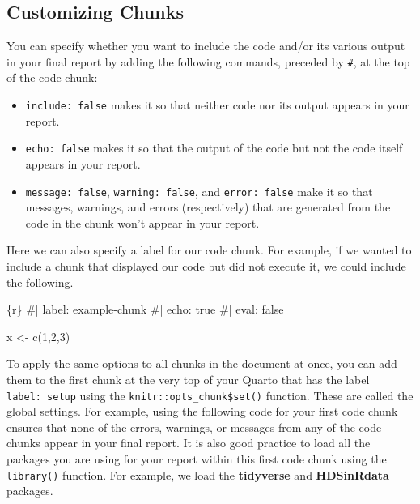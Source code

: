 \documentclass[
  letterpaper,
]{latex/krantz}
\makeatletter
\newenvironment{Shaded}{\begin{snugshade}}{\end{snugshade}}
\newcommand{\InformationTok}[1]{\textcolor[rgb]{0.37,0.37,0.37}{#1}}
\newenvironment{kframe}{%
\medskip{}
\setlength{\fboxsep}{.8em}
 \def\at@end@of@kframe{}%
 \ifinner\ifhmode%
  \def\at@end@of@kframe{\end{minipage}}%
  \begin{minipage}{\columnwidth}%
 \fi\fi%
 \def\FrameCommand##1{\hskip\@totalleftmargin \hskip-\fboxsep
 \colorbox{shadecolor}{##1}\hskip-\fboxsep
     \hskip-\linewidth \hskip-\@totalleftmargin \hskip\columnwidth}%
 \MakeFramed {\advance\hsize-\width
   \@totalleftmargin\z@ \linewidth\hsize
   \@setminipage}}%
 {\par\unskip\endMakeFramed%
 \at@end@of@kframe}
\renewenvironment{Shaded}{\begin{kframe}}{\end{kframe}}
\makeatother
\begin{document}
\subsection{Customizing Chunks}\label{customizing-chunks}

You can specify whether you want to include the code and/or its various
output in your final report by adding the following commands, preceded
by \texttt{\#\textbar{}}, at the top of the code chunk:

\begin{itemize}
\item
  \texttt{include:\ false} makes it so that neither code nor its output
  appears in your report.
\item
  \texttt{echo:\ false} makes it so that the output of the code but not
  the code itself appears in your report.
\item
  \texttt{message:\ false}, \texttt{warning:\ false}, and
  \texttt{error:\ false} make it so that messages, warnings, and errors
  (respectively) that are generated from the code in the chunk won't
  appear in your report.
\end{itemize}

Here we can also specify a label for our code chunk. For example, if we
wanted to include a chunk that displayed our code but did not execute
it, we could include the following.

\begin{Shaded}
\begin{Highlighting}[]
  \InformationTok{\textasciigrave{}\textasciigrave{}\textasciigrave{}\{r\}}
\InformationTok{\#| label: example{-}chunk}
\InformationTok{\#| echo: true}
\InformationTok{\#| eval: false}

\InformationTok{x \textless{}{-} c(1,2,3)}
\InformationTok{\textasciigrave{}\textasciigrave{}\textasciigrave{}}
\end{Highlighting}
\end{Shaded}

To apply the same options to all chunks in the document at once, you can
add them to the first chunk at the very top of your Quarto that has the
label \texttt{label:\ setup} using the
\texttt{knitr::opts\_chunk\$set()}
function.
These are called the global settings. For example, using the following
code for your first code chunk ensures that none of the errors,
warnings, or messages from any of the code chunks appear in your final
report. It is also good practice to load all the packages you are using
for your report within this first code chunk using the
\texttt{library()} function. For example, we load the
\textbf{tidyverse} and
\textbf{HDSinRdata} packages.
\end{document}
